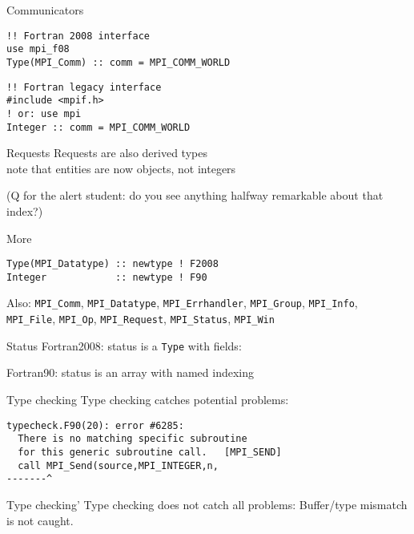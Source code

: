 \begin{numberedframe}{Communicators}
\begin{lstlisting}
!! Fortran 2008 interface
use mpi_f08
Type(MPI_Comm) :: comm = MPI_COMM_WORLD
\end{lstlisting}
\begin{lstlisting}
!! Fortran legacy interface
#include <mpif.h>
! or: use mpi
Integer :: comm = MPI_COMM_WORLD
\end{lstlisting}
\end{numberedframe}

\begin{numberedframe}{Requests}
  Requests are also derived types\\
  note that  entities are now objects, not integers


  (Q for the alert student: do you see anything halfway
  remarkable about that index?)
\end{numberedframe}

\begin{numberedframe}{More}
\begin{lstlisting}
Type(MPI_Datatype) :: newtype ! F2008
Integer            :: newtype ! F90
\end{lstlisting}

Also:
  \lstinline{MPI_Comm}, \lstinline{MPI_Datatype},
  \lstinline{MPI_Errhandler}, \lstinline{MPI_Group},
  \lstinline{MPI_Info}, \lstinline{MPI_File}, \lstinline{MPI_Op},
  \lstinline{MPI_Request}, \lstinline{MPI_Status}, \lstinline{MPI_Win}
\end{numberedframe}

\begin{numberedframe}{Status}
  Fortran2008: status is a \lstinline{Type} with fields:

  Fortran90: status is an array with named indexing
\end{numberedframe}

\begin{numberedframe}{Type checking}
  Type checking catches potential problems:
\begin{verbatim}
typecheck.F90(20): error #6285: 
  There is no matching specific subroutine
  for this generic subroutine call.   [MPI_SEND]
  call MPI_Send(source,MPI_INTEGER,n,
-------^
\end{verbatim}
\end{numberedframe}

\begin{numberedframe}{Type checking'}
  Type checking does not catch all problems:
  Buffer/type mismatch is not caught.
\end{numberedframe}

\lstset{language=C}
